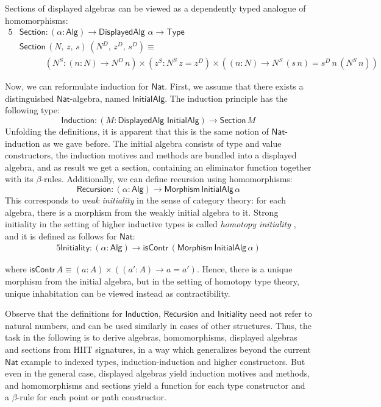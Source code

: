 \documentclass[dvipsnames]{lmcs} %
\newcommand{\ra}{\rightarrow}
\newcommand{\Nat}{\mathsf{Nat}}
\newcommand{\1}{\mathsf{1}} \renewcommand{\Pr}{\mathsf{Pr}}
\newcommand{\Alg}{\mathsf{Alg}}
\newcommand{\DisplayedAlg}{\mathsf{DisplayedAlg}}
\newcommand{\Morphism}{\mathsf{Morphism}}
\newcommand{\Section}{\mathsf{Section}}
\theoremstyle{plain}\newtheorem{satz}[thm]{Satz} %
\begin{document}
\noindent Sections of displayed algebras can be viewed as a dependently typed analogue of homomorphisms:
\begin{alignat*}{5}
& \Section : (\alpha : \Alg) \ra \DisplayedAlg\,\,\alpha \ra \mathsf{Type} && \\
& \Section\,(N,\,z,\,s)\,(N^D,\,z^D,\,s^D) \equiv && \\
&  \hspace{3em} (N^S : (n : N) \ra N^D\,n)\times (z^S : N^S\,z = z^D)\times ((n : N)\ra N^S\,(s\,n) = s^D\,n\,(N^S\,n))
\end{alignat*}

\noindent Now, we can reformulate induction for $\Nat$. First, we assume that
there exists a distinguished $\Nat$-algebra, named $\mathsf{InitialAlg}$. The
induction principle has the following type:
\[
 \mathsf{Induction} : (M : \mathsf{\DisplayedAlg}\,\,\mathsf{InitialAlg}) \ra \Section\, M
\]
\noindent Unfolding the definitions, it is apparent that this is the same notion
of $\Nat$-induction as we gave before. The initial algebra consists of type and value
constructors, the induction motives and methods are bundled into a displayed
algebra, and as result we get a section, containing an eliminator function together
with its $\beta$-rules. Additionally, we can define recursion using homomorphisms:
\[
\mathsf{Recursion} : (\alpha : \Alg) \ra \Morphism\,\mathsf{InitialAlg}\,\alpha
\]
This corresponds to \emph{weak initiality} in the sense of category theory: for
each algebra, there is a morphism from the weakly initial algebra to it. Strong initiality
in the setting of higher inductive types is called \emph{homotopy initiality} \cite{sojakova},
and it is defined as follows for $\Nat$:
\begin{alignat*}{5}
\mathsf{Initiality} : (\alpha : \Alg) \ra \mathsf{isContr}\,(\Morphism\,\mathsf{InitialAlg}\,\alpha)
\end{alignat*}

\noindent where $\mathsf{isContr}\,A \equiv (a : A)\times((a' : A)\ra a = a')$. Hence, there is a unique morphism from the initial algebra, but in the setting of homotopy type theory, unique inhabitation can be viewed instead as contractibility.

Observe that the definitions for $\mathsf{Induction}$, $\mathsf{Recursion}$ and
$\mathsf{Initiality}$ need not refer to natural numbers, and can be used
similarly in cases of other structures. Thus, the task in the following is to
derive algebras, homomorphisms, displayed algebras and sections from HIIT
signatures, in a way which generalizes beyond the current $\Nat$ example to
indexed types, induction-induction and higher constructors. But even in the
general case, displayed algebras yield induction motives and methods, and
homomorphisms and sections yield a function for each type constructor and a
$\beta$-rule for each point or path constructor.
\end{document}
